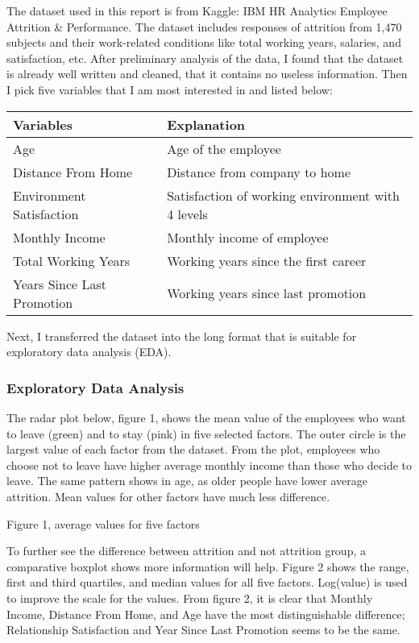 \documentclass[
]{article}
\begin{document}
The dataset used in this report is from Kaggle: IBM HR Analytics
Employee Attrition \& Performance. The dataset includes responses of
attrition from 1,470 subjects and their work-related conditions like
total working years, salaries, and satisfaction, etc. After preliminary
analysis of the data, I found that the dataset is already well written
and cleaned, that it contains no useless information. Then I pick five
variables that I am most interested in and listed below:

\begin{longtable}[]{@{}
  >{\raggedright\arraybackslash}p{}
  >{\raggedright\arraybackslash}p{}@{}}
\toprule
Variables & Explanation \\
\midrule
\endhead
Age & Age of the employee \\
Distance From Home & Distance from company to home \\
Environment Satisfaction & Satisfaction of working environment with 4
levels \\
Monthly Income & Monthly income of employee \\
Total Working Years & Working years since the first career \\
Years Since Last Promotion & Working years since last promotion \\
\bottomrule
\end{longtable}

Next, I transferred the dataset into the long format that is suitable
for exploratory data analysis (EDA).

\hypertarget{exploratory-data-analysis}{%
\subsubsection{Exploratory Data
Analysis}\label{exploratory-data-analysis}}

The radar plot below, figure 1, shows the mean value of the employees
who want to leave (green) and to stay (pink) in five selected factors.
The outer circle is the largest value of each factor from the dataset.
From the plot, employees who choose not to leave have higher average
monthly income than those who decide to leave. The same pattern shows in
age, as older people have lower average attrition. Mean values for other
factors have much less difference.

Figure 1, average values for five factors

To further see the difference between attrition and not attrition group,
a comparative boxplot shows more information will help. Figure 2 shows
the range, first and third quartiles, and median values for all five
factors. Log(value) is used to improve the scale for the values. From
figure 2, it is clear that Monthly Income, Distance From Home, and Age
have the most distinguishable difference; Relationship Satisfaction and
Year Since Last Promotion seems to be the same.
\end{document}
